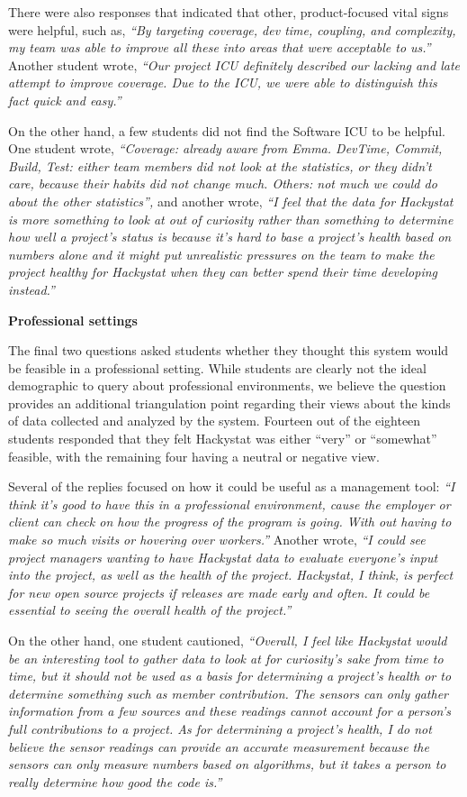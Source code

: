\documentclass{acm_proc_article-sp}
\begin{document}
There were also responses that indicated that other, product-focused vital
signs were helpful, such as, {\em ``By targeting coverage, dev time,
coupling, and complexity, my team was able to improve all these into areas
that were acceptable to us.''}  Another student wrote, {\em ``Our project
ICU definitely described our lacking and late attempt to improve
coverage. Due to the ICU, we were able to distinguish this fact quick and
easy.''}

On the other hand, a few students did not find the Software ICU to be
helpful.  One student wrote, {\em ``Coverage: already aware from
Emma. DevTime, Commit, Build, Test: either team members did not look at the
statistics, or they didn't care, because their habits did not change
much. Others: not much we could do about the other statistics'',} and
another wrote, {\em ``I feel that the data for Hackystat is more something
to look at out of curiosity rather than something to determine how well a
project's status is because it's hard to base a project's health based on
numbers alone and it might put unrealistic pressures on the team to make
the project healthy for Hackystat when they can better spend their time
developing instead.''}

{\bf Professional settings}

The final two questions asked students whether they thought this system
would be feasible in a professional setting.  While students are clearly
not the ideal demographic to query about professional environments, we
believe the question provides an additional triangulation point regarding
their views about the kinds of data collected and analyzed by the system.
Fourteen out of the eighteen students responded that they felt Hackystat
was either ``very'' or ``somewhat'' feasible, with the remaining four
having a neutral or negative view.

Several of the replies focused on how it could be useful as a management
tool: {\em ``I think it's good to have this in a professional environment,
cause the employer or client can check on how the progress of the program
is going. With out having to make so much visits or hovering over
workers.''} Another wrote, {\em ``I could see project managers wanting to
have Hackystat data to evaluate everyone's input into the project, as well
as the health of the project. Hackystat, I think, is perfect for new open
source projects if releases are made early and often. It could be essential
to seeing the overall health of the project.''}

On the other hand, one student cautioned, {\em ``Overall, I feel like
Hackystat would be an interesting tool to gather data to look at for
curiosity's sake from time to time, but it should not be used as a basis
for determining a project's health or to determine something such as member
contribution. The sensors can only gather information from a few sources
and these readings cannot account for a person's full contributions to a
project. As for determining a project's health, I do not believe the sensor
readings can provide an accurate measurement because the sensors can only
measure numbers based on algorithms, but it takes a person to really
determine how good the code is.''}
\end{document}
